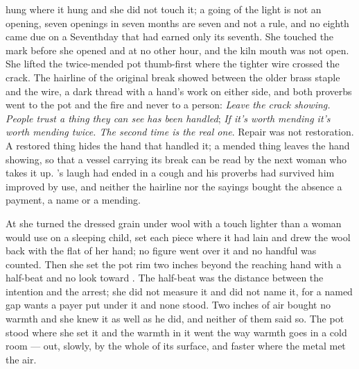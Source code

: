  hung where it hung and she did not touch it; a going of the light is not an opening, seven openings in seven months are seven and not a rule, and no eighth came due on a Seventhday that had earned only its seventh. She touched the mark before she opened  and at no other hour, and the kiln mouth was not open. She lifted the twice-mended pot thumb-first where the tighter wire crossed the crack. The hairline of the original break showed between the older brass staple and the wire, a dark thread with a hand's work on either side, and both proverbs went to the pot and the fire and never to a person: \emph{Leave the crack showing. People trust a thing they can see has been handled}; \emph{If it's worth mending it's worth mending twice. The second time is the real one}. Repair was not restoration. A restored thing hides the hand that handled it; a mended thing leaves the hand showing, so that a vessel carrying its break can be read by the next woman who takes it up. 's laugh had ended in a cough and his proverbs had survived him improved by use, and neither the hairline nor the sayings bought the absence a payment, a name or a mending.

At  she turned the dressed grain under wool with a touch lighter than a woman would use on a sleeping child, set each piece where it had lain and drew the wool back with the flat of her hand; no figure went over it and no handful was counted. Then she set the pot rim two inches beyond the reaching hand with a half-beat and no look toward . The half-beat was the distance between the intention and the arrest; she did not measure it and did not name it, for a named gap wants a payer put under it and none stood. Two inches of air bought no warmth and she knew it as well as he did, and neither of them said so. The pot stood where she set it and the warmth in it went the way warmth goes in a cold room --- out, slowly, by the whole of its surface, and faster where the metal met the air.

